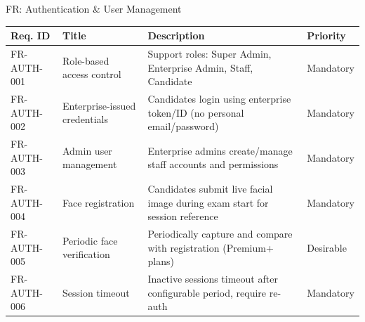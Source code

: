 \begin{frame}{FR: Authentication \& User Management}
    \begin{table}[]
        \centering
        \tiny
        \begin{tabular}{|l|p{3.5cm}|p{5cm}|l|}
            \hline
            \textbf{Req. ID} & \textbf{Title} & \textbf{Description} & \textbf{Priority} \\
            \hline
            FR-AUTH-001 & Role-based access control & Support roles: Super Admin, Enterprise Admin, Staff, Candidate & Mandatory \\
            \hline
            FR-AUTH-002 & Enterprise-issued credentials & Candidates login using enterprise token/ID (no personal email/password) & Mandatory \\
            \hline
            FR-AUTH-003 & Admin user management & Enterprise admins create/manage staff accounts and permissions & Mandatory \\
            \hline
            FR-AUTH-004 & Face registration & Candidates submit live facial image during exam start for session reference & Mandatory \\
            \hline
            FR-AUTH-005 & Periodic face verification & Periodically capture and compare with registration (Premium+ plans) & Desirable \\
            \hline
            FR-AUTH-006 & Session timeout & Inactive sessions timeout after configurable period, require re-auth & Mandatory \\
            \hline
        \end{tabular}
    \end{table}
\end{frame}

